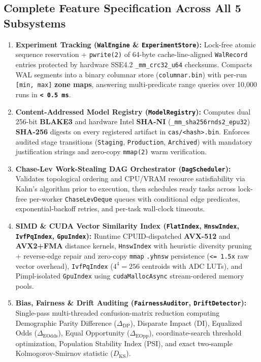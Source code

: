 \documentclass[11pt,a4paper]{article}
\begin{document}
\subsection{Complete Feature Specification Across All 5 Subsystems}
\begin{enumerate}[leftmargin=1.5em]
  \item \textbf{Experiment Tracking (\texttt{WalEngine} \& \texttt{ExperimentStore}):} Lock-free atomic sequence reservation + \texttt{pwrite(2)} of 64-byte cache-line-aligned \texttt{WalRecord} entries protected by hardware SSE4.2 \texttt{\_mm\_crc32\_u64} checksums. Compacts WAL segments into a binary columnar store (\texttt{columnar.bin}) with per-run \texttt{[min, max]} \textbf{zone maps}, answering multi-predicate range queries over 10,000 runs in \textbf{\texttt{< 0.5 ms}}.
  \item \textbf{Content-Addressed Model Registry (\texttt{ModelRegistry}):} Computes dual 256-bit \textbf{BLAKE3} and hardware Intel \textbf{SHA-NI} (\texttt{\_mm\_sha256rnds2\_epu32}) \textbf{SHA-256} digests on every registered artifact in \texttt{cas/<hash>.bin}. Enforces audited stage transitions (\texttt{Staging}, \texttt{Production}, \texttt{Archived}) with mandatory justification strings and zero-copy \texttt{mmap(2)} warm verification.
  \item \textbf{Chase-Lev Work-Stealing DAG Orchestrator (\texttt{DagScheduler}):} Validates topological ordering and CPU/VRAM resource satisfiability via Kahn's algorithm prior to execution, then schedules ready tasks across lock-free per-worker \texttt{ChaseLevDeque} queues with conditional edge predicates, exponential-backoff retries, and per-task wall-clock timeouts.
  \item \textbf{SIMD \& CUDA Vector Similarity Index (\texttt{FlatIndex}, \texttt{HnswIndex}, \texttt{IvfPqIndex}, \texttt{GpuIndex}):} Runtime CPUID-dispatched \textbf{AVX-512} and \textbf{AVX2+FMA} distance kernels, \texttt{HnswIndex} with heuristic diversity pruning + reverse-edge repair and zero-copy \texttt{mmap} \texttt{.yhnsw} persistence (\texttt{<= 1.5x} raw vector overhead), \texttt{IvfPqIndex} ($4^4 = 256$ centroids with ADC LUTs), and Pimpl-isolated \texttt{GpuIndex} using \texttt{cudaMallocAsync} stream-ordered memory pools.
  \item \textbf{Bias, Fairness \& Drift Auditing (\texttt{FairnessAuditor}, \texttt{DriftDetector}):} Single-pass multi-threaded confusion-matrix reduction computing Demographic Parity Difference ($\Delta_{\text{DP}}$), Disparate Impact ($\text{DI}$), Equalized Odds ($\Delta_{\text{EOdds}}$), Equal Opportunity ($\Delta_{\text{EOpp}}$), coordinate-search threshold optimization, Population Stability Index (PSI), and exact two-sample Kolmogorov-Smirnov statistic ($D_{\text{KS}}$).
\end{enumerate}
\end{document}
